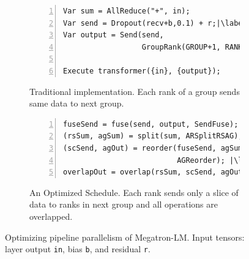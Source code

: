 \begin{figure}[!t]
	\small
	\begin{subfigure}{\columnwidth}
		\begin{lstlisting}[language=DSL, numbers=left]
Var sum = AllReduce("+", in);
Var send = Dropout(recv+b,0.1) + r;|\label{line:p2p:comp1}||\label{line:p2p:comp2}|
Var output = Send(send, 
                  GroupRank(GROUP+1, RANK));

Execute transformer({in}, {output});
		\end{lstlisting}
		\caption{Traditional implementation. Each rank of a group sends same data to next group.}
		\label{fig:traditional-p2p}
	\end{subfigure}
	\par\bigskip %
	\begin{subfigure}{\columnwidth}
		\begin{lstlisting}[language=DSL, numbers=left]
fuseSend = fuse(send, output, SendFuse);|\label{line:p2p:fuse-send}|
(rsSum, agSum) = split(sum, ARSplitRSAG); |\label{line:p2p:split}|
(scSend, agOut) = reorder(fuseSend, agSum, 
                          AGReorder); |\label{line:p2p:reorder}|
overlapOut = overlap(rsSum, scSend, agOut); |\label{line:p2p:fuseAR}|
		\end{lstlisting}
		\caption{An Optimized Schedule. Each rank sends only a slice of data to ranks in next group and all operations are overlapped.}
		\label{fig:p2p-schedule}
	\end{subfigure}
	\caption{Optimizing pipeline parallelism of Megatron-LM. Input tensors: layer output \texttt{in}, bias \texttt{b}, and residual \texttt{r}. \label{fig:optimizing-p2p}}
\end{figure}


\iffalse

